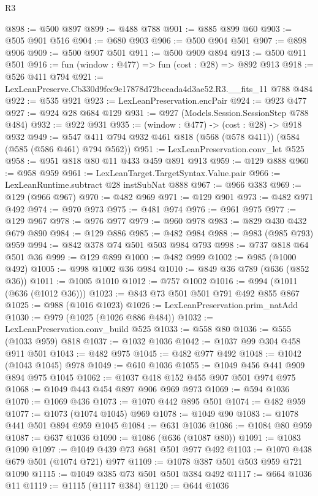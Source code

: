 \begin{lexlean}{R3}
\begin{coremodule}
@898 := @500 @897
@899 := @488 @788
@901 := @885 @899 @60
@903 := @505 @901 @516
@904 := @680 @903
@906 := @500 @904 @501
@907 := @898 @906
@909 := @500 @907 @501
@911 := @500 @909 @894
@913 := @500 @911 @501
@916 := fun (window : @477) => fun (cost : @28) => @892 @913
@918 := @526 @411 @794
@921 := LexLeanPreserve.Cb330d9fcc9e17878d72bceada4d3ae52.R3.__fits_11 @788 @484
@922 := @535 @921
@923 := LexLeanPreservation.encPair
@924 := @923 @477
@927 := @924 @28 @684 @129
@931 := @927 (Models.Session.SessionStep @788 @484)
@932 := @922 @931
@935 := (window : @477) -> (cost : @28) -> @918 @932
@949 := @547 @411 @794 @932 @461 @818 (@568 (@578 @411)) (@584 (@585 (@586 @461) @794 @562))
@951 := LexLeanPreservation.conv_let @525
@958 := @951 @818 @80 @11 @433 @459 @891 @913
@959 := @129 @888
@960 := @958 @959
@961 := LexLeanTarget.TargetSyntax.Value.pair
@966 := LexLeanRuntime.subtract @28 instSubNat @888
@967 := @966 @383
@969 := @129 (@966 @967)
@970 := @482 @969
@971 := @129 @901
@973 := @482 @971 @492
@974 := @970 @973
@975 := @481 @974
@976 := @961 @975
@977 := @129 @967
@978 := @976 @977
@979 := @960 @978
@983 := @829 @430 @432 @679 @890
@984 := @129 @886
@985 := @482 @984
@988 := @983 (@985 @793) @959
@994 := @842 @378 @74 @501 @503 @984 @793
@998 := @737 @818 @64 @501 @36
@999 := @129 @899
@1000 := @482 @999
@1002 := @985 (@1000 @492)
@1005 := @998 @1002 @36 @984
@1010 := @849 @36 @789 (@636 (@852 @36))
@1011 := @1005 @1010
@1012 := @757 @1002
@1016 := @994 (@1011 (@636 (@1012 @36)))
@1023 := @843 @73 @501 @501 @791 @492 @855 @867
@1025 := @988 (@1016 @1023)
@1026 := LexLeanPreservation.prim_natAdd
@1030 := @979 (@1025 (@1026 @886 @484))
@1032 := LexLeanPreservation.conv_build @525
@1033 := @558 @80
@1036 := @555 (@1033 @959) @818
@1037 := @1032 @1036
@1042 := @1037 @99 @304 @458 @911 @501
@1043 := @482 @975
@1045 := @482 @977 @492
@1048 := @1042 (@1043 @1045) @978
@1049 := @610 @1036
@1055 := @1049 @456 @441 @909 @894 @975 @1045
@1062 := @1037 @418 @152 @455 @907 @501 @974 @975
@1068 := @1049 @443 @454 @897 @906 @969 @973
@1069 := @594 @1036
@1070 := @1069 @436
@1073 := @1070 @442 @895 @501
@1074 := @482 @959
@1077 := @1073 (@1074 @1045) @969
@1078 := @1049 @90
@1083 := @1078 @441 @501 @894 @959 @1045
@1084 := @631 @1036
@1086 := @1084 @80 @959
@1087 := @637 @1036
@1090 := @1086 (@636 (@1087 @80))
@1091 := @1083 @1090
@1097 := @1049 @439 @73 @681 @501 @977 @492
@1103 := @1070 @438 @679 @501 (@1074 @721) @977
@1109 := @1078 @387 @501 @503 @959 @721 @1090
@1115 := @1049 @385 @73 @501 @501 @384 @492
@1117 := @664 @1036 @11
@1119 := @1115 (@1117 @384)
@1120 := @644 @1036

\end{coremodule}
\end{lexlean}

